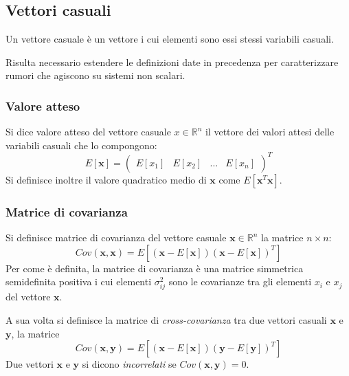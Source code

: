 \documentclass[12pt,a4paper]{article}
\newcommand{\vett}{\mathbf}
\begin{document}
\newpage
\subsection{Vettori casuali}

Un vettore casuale è un vettore i cui elementi sono essi stessi variabili casuali.

Risulta necessario estendere le definizioni date in precedenza per caratterizzare rumori che agiscono su sistemi non scalari.

\subsubsection{Valore atteso}

Si dice valore atteso del vettore casuale $x \in \mathbb{R}^n$ il vettore dei valori attesi delle variabili casuali che lo compongono: \[E[\vett{x}] = \begin{pmatrix}
E[x_1] & E[x_2] & \dots & E[x_n]
\end{pmatrix}^T
\]
Si definisce inoltre il valore quadratico medio di $\vett{x}$ come $E[\vett{x}^T \vett{x}]$.

\subsubsection{Matrice di covarianza}

Si definisce matrice di covarianza del vettore casuale $\vett{x} \in \mathbb{R}^n$ la matrice $n \times n$: \[ Cov(\vett{x}, \vett{x}) = E[(\vett{x}-E[\vett{x}])(\vett{x}-E[\vett{x}])^T]\]
Per come è definita, la matrice di covarianza è una matrice simmetrica semidefinita positiva i cui elementi $\sigma^2_{ij}$ sono le covarianze tra gli elementi $x_i$ e $x_j$ del vettore $\vett{x}$.

A sua volta si definisce la matrice di \textit{cross-covarianza} tra due vettori casuali $\vett{x}$ e $\vett{y}$, la matrice \[ Cov(\vett{x}, \vett{y}) = E[(\vett{x}-E[\vett{x}])(\vett{y}-E[\vett{y}])^T]\]
Due vettori $\vett{x}$ e $\vett{y}$ si dicono \textit{incorrelati} se $Cov(\vett{x},\vett{y}) = 0$.
\end{document}

